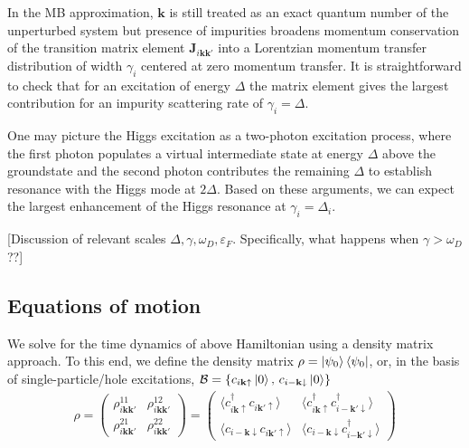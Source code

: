 \documentclass[aps,prb,reprint,noeprint,superscriptaddress]{revtex4-1}
\begin{document}
In the MB approximation, $\mathbf{k}$ is still treated as an exact quantum
number of the unperturbed system but presence of impurities 
broadens momentum conservation of the transition matrix element
$\mathbf{J}_{i\mathbf{kk'}}$ into a Lorentzian momentum transfer distribution of
width $\gamma_i$ centered at zero momentum transfer. 
It is straightforward to check that for an excitation of energy $\Delta$ 
the matrix element gives the largest contribution 
for an impurity scattering rate of $\gamma_i=\Delta$. 

One may picture the Higgs excitation as a two-photon excitation process, where
the first photon populates a virtual intermediate state at energy $\Delta$ above
the groundstate and the second photon contributes the remaining $\Delta$ to
establish resonance with the Higgs mode at $2\Delta$.
Based on
these arguments, we can expect the largest enhancement of the Higgs resonance at 
$\gamma_i = \Delta_i$.

[Discussion of relevant scales $\Delta, \gamma, \omega_D, \varepsilon_F$.
Specifically, what happens when $\gamma>\omega_D$??]


\subsection{Equations of motion}

We solve for the time dynamics of above Hamiltonian using a density matrix
approach. To this end, we define the density matrix $\rho =
\ket{\psi_0}\bra{\psi_0}$, or, in the basis of single-particle/hole excitations,
$\mathcal{B}=\left\{ c_{i\mathbf{k}\uparrow }\ket{0},\, c_{i-\mathbf{k}\downarrow
}\ket{0} \right\}$
\begin{eqnarray*}
  \rho = 
  \begin{pmatrix}
    \rho_{i\mathbf{kk'}}^{11} &
    \rho_{i\mathbf{kk'}}^{12} \\
    \rho_{i\mathbf{kk'}}^{21} &
    \rho_{i\mathbf{kk'}}^{22}
  \end{pmatrix}
  =
  \begin{pmatrix}
    \langle c_{i\mathbf{k}\uparrow }^\dagger c_{i\mathbf{k}'\uparrow }\rangle
    &
    \langle c_{i\mathbf{k}\uparrow }^\dagger c_{i-\mathbf{k}'\downarrow
    }^\dagger \rangle
    \\
    \langle 
    c_{i-\mathbf{k}\downarrow }c_{i\mathbf{k'}\uparrow }
    \rangle
    &
    \langle 
    c_{i-\mathbf{k}\downarrow }c_{i\mathbf{-k'}\downarrow }^\dagger 
    \rangle
  \end{pmatrix}
\end{eqnarray*}
\end{document}
